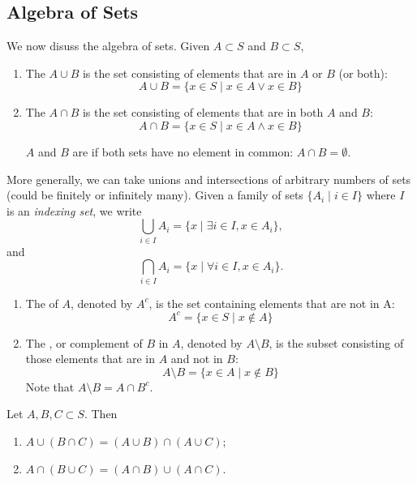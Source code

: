 \subsection{Algebra of Sets}
We now disuss the algebra of sets. Given $A \subset S$ and $B \subset S$,
\begin{enumerate}[label=(\roman*)]
\item The  $A \cup B$ is the set consisting of elements that are in $A$ or $B$ (or both):
\[ A\cup B=\{x \in S \mid x\in A \lor x\in B\} \]

\item The  $A \cap B$ is the set consisting of elements that are in both $A$ and $B$:
\[ A\cap B=\{x \in S \mid x\in A \land x\in B\} \]

$A$ and $B$ are  if both sets have no element in common: $A\cap B=\emptyset$.
\end{enumerate}

More generally, we can take unions and intersections of arbitrary numbers of sets (could be finitely or infinitely many). Given a family of sets $\{A_i\mid i\in I\}$ where $I$ is an \emph{indexing set}, we write
\[\bigcup_{i\in I}A_i=\{x \mid \exists i\in I, x\in A_i\},\]
and
\[\bigcap_{i\in I}A_i=\{x \mid \forall i\in I, x\in A_i\}.\]

\begin{enumerate}[resume*]
\item The  of $A$, denoted by $A^c$, is the set containing elements that are not in A:
\[ A^c = \{x \in S \mid x \notin A\} \]

\item The , or complement of $B$ in $A$, denoted by $A\setminus B$, is the subset consisting of those elements that are in $A$ and not in $B$:
\[ A\setminus B = \{x \in A \mid x \notin B\} \]
Note that $A\setminus B = A \cap B^c$.
\end{enumerate}

\begin{lemma}
Let $A,B,C\subset S$. Then
\begin{enumerate}[label=(\roman*)]
\item $A\cup(B\cap C)=(A\cup B)\cap(A\cup C)$;
\item $A\cap(B\cup C)=(A\cap B)\cup(A\cap C)$.
\end{enumerate}
\end{lemma}

